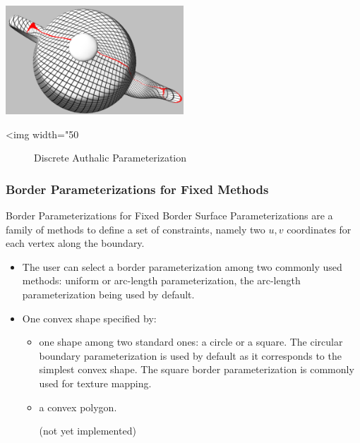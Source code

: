 \begin{center}
    \label{parameterization-fig-authalic}
    \begin{ccTexOnly}
        \includegraphics[width=0.5\textwidth]{Parameterization/authalic} %
    \end{ccTexOnly}
    \begin{ccHtmlOnly}
        <img width="50%
    \end{ccHtmlOnly}
    \begin{figure}[h]
        \caption{Discrete Authalic Parameterization}
    \end{figure}
\end{center}


\subsubsection{Border Parameterizations for Fixed Methods}
\label{sec:Border-Parameterizations-for-Fixed-Methods}

Border Parameterizations for Fixed Border Surface Parameterizations
are a family of methods to define a set of constraints, namely two
$u,v$ coordinates for each vertex along the boundary.

\begin{itemize}

\item The user can select a border parameterization among
two commonly used methods: uniform or arc-length parameterization, the
arc-length parameterization being used by default.

\item One convex shape specified by:

    \begin{itemize}

    \item one shape among two standard ones: a circle or a square.
    The circular boundary parameterization is used by default as it
    corresponds to the simplest convex shape. The square border
    parameterization is commonly used for texture mapping.

    \item a convex polygon.

    (not yet implemented)

    \end{itemize}

\end{itemize}

